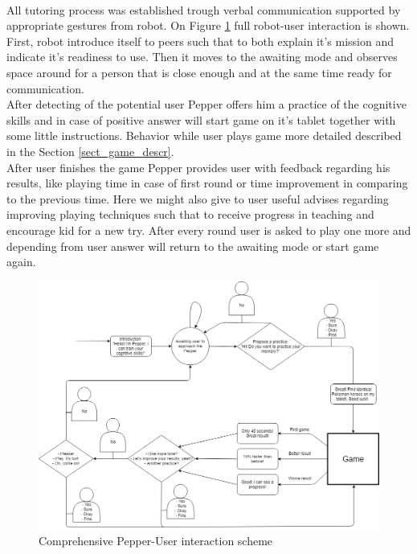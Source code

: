 \documentclass[12pt]{article}
\begin{document}
\\
All tutoring process was established trough verbal communication supported by appropriate gestures from robot. On Figure \ref{concept_scheme} full robot-user interaction is shown. 
\\
First, robot introduce itself to peers such that to both explain it's mission and indicate it's readiness to use. Then it moves to the awaiting mode and observes space around for a person that is close enough and at the same time ready for communication.
\\
After detecting of the potential user Pepper offers him a practice of the cognitive skills and in case of positive answer will start game on it's tablet together with some little instructions. Behavior while user plays game more detailed described in the Section \ref{sect_game_descr}.
\\
After user finishes the game Pepper provides user with feedback regarding his results, like playing time in case of first round or time  improvement in comparing to the previous time. Here we might also give to user useful advises regarding improving playing techniques such that to receive progress in teaching and encourage kid for a new try. After  every round user is asked to play one more and depending from user answer will return to the awaiting mode or start game again.
\begin{figure}[!h]
\begin{center}
\includegraphics[scale=0.43]{images/HRI_concept.png}
\caption{Comprehensive Pepper-User interaction scheme}
\label{concept_scheme}
\end{center}
\end{figure}
\end{document}
